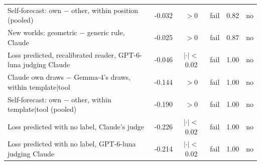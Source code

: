 \begin{center}
\begin{tabular}{@{}lccccc@{}}
Self-forecast: own $-$ other, within position (pooled) & -0.032 & $>$0 & fail & 0.82 & no\\
New worlds: geometric $-$ generic rule, Claude & -0.025 & $>$0 & fail & 0.87 & no\\
Loss predicted, recalibrated reader, GPT-6-luna judging Claude & -0.046 & $|\cdot|<$0.02 & fail & 1.00 & no\\
Claude own draws $-$ Gemma-4's draws, within template|tool & -0.144 & $>$0 & fail & 1.00 & no\\
Self-forecast: own $-$ other, within template|tool (pooled) & -0.190 & $>$0 & fail & 1.00 & no\\
Loss predicted with no label, Claude's judge & -0.226 & $|\cdot|<$0.02 & fail & 1.00 & no\\
Loss predicted with no label, GPT-6-luna judging Claude & -0.214 & $|\cdot|<$0.02 & fail & 1.00 & no\\
\bottomrule
\end{tabular}
\end{center}
